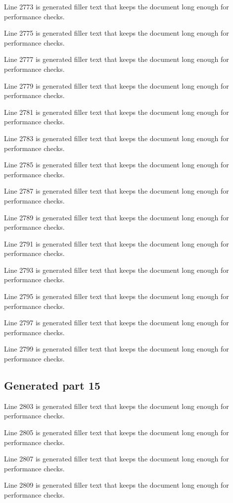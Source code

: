 Line 2773 is generated filler text that keeps the document long enough for performance checks.

Line 2775 is generated filler text that keeps the document long enough for performance checks.

Line 2777 is generated filler text that keeps the document long enough for performance checks.

Line 2779 is generated filler text that keeps the document long enough for performance checks.

Line 2781 is generated filler text that keeps the document long enough for performance checks.

Line 2783 is generated filler text that keeps the document long enough for performance checks.

Line 2785 is generated filler text that keeps the document long enough for performance checks.

Line 2787 is generated filler text that keeps the document long enough for performance checks.

Line 2789 is generated filler text that keeps the document long enough for performance checks.

Line 2791 is generated filler text that keeps the document long enough for performance checks.

Line 2793 is generated filler text that keeps the document long enough for performance checks.

Line 2795 is generated filler text that keeps the document long enough for performance checks.

Line 2797 is generated filler text that keeps the document long enough for performance checks.

Line 2799 is generated filler text that keeps the document long enough for performance checks.

\subsection{Generated part 15}

Line 2803 is generated filler text that keeps the document long enough for performance checks.

Line 2805 is generated filler text that keeps the document long enough for performance checks.

Line 2807 is generated filler text that keeps the document long enough for performance checks.

Line 2809 is generated filler text that keeps the document long enough for performance checks.

